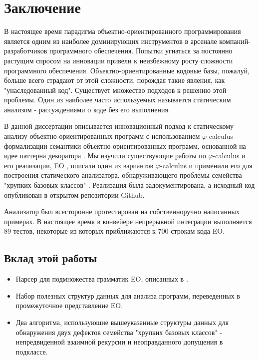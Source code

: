 \chapter{Заключение}
\label{chap:conclusion}

В настоящее время парадигма объектно-ориентированного программирования является одним из наиболее доминирующих инструментов в арсенале компаний-разработчиков программного обеспечения. Попытки угнаться за постоянно растущим спросом на инновации привели к неизбежному росту сложности программного обеспечения. Объектно-ориентированные кодовые базы, пожалуй, больше всего страдают от этой сложности, порождая такие явления, как "унаследованный код"\cite{legacy}. Существует множество подходов к решению этой проблемы. Один из наиболее часто используемых называется статическим анализом - рассуждениями о коде без его выполнения. 

В данной диссертации описывается инновационный подход к статическому анализу объектно-ориентированных программ с использованием $\varphi$-calculus - формализации семантики объектно-ориентированных программ, основанной на идее паттерна декоратора \cite{GOFPatterns}. Мы изучили существующие работы по $\varphi$-calculus и его реализации, EO \cite{eolang}, описали один из вариантов $\varphi$-calculus и применили его для построения статического анализатора, обнаруживающего проблемы семейства "хрупких базовых классов" \cite{fragilebaseclass}. Реализация была задокументирована, а исходный код опубликован в открытом репозитории Github.

Анализатор был всесторонне протестирован на собственноручно написанных примерах. В настоящее время в конвейере непрерывной интеграции выполняется 89 тестов, некоторые из которых приближаются к 700 строкам кода EO. 

\section{Вклад этой работы}
\begin{itemize}
    \item Парсер для подмножества грамматик EO, описанных в \cite{eolang}.
    \item Набор полезных структур данных для анализа программ, переведенных в промежуточное представление EO. 
    \item Два алгоритма, использующие вышеуказанные структуры данных для обнаружения двух дефектов семейства "хрупких базовых классов" - непредвиденной взаимной рекурсии и неоправданного допущения в подклассе.
\end{itemize}

